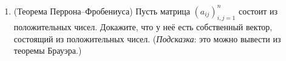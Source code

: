 \documentclass[12pt]{article}
\def\RR{\mathbb{R}}
\begin{document}
\begin{enumerate}
  \item (Теорема Перрона--Фробениуса) Пусть матрица $(a_{ij})_{i,j=1}^n$ состоит из положительных чисел. Докажите, что у неё есть собственный вектор, состоящий из положительных чисел.
  (\emph{Подсказка}: это можно вывести из теоремы Брауэра.)

%



%

%


\end{enumerate}
\end{document}
